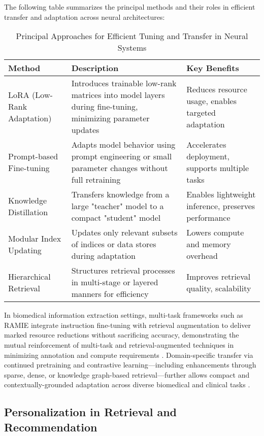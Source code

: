 \documentclass[sigconf]{acmart}
\begin{document}
The following table summarizes the principal methods and their roles in efficient transfer and adaptation across neural architectures:

\begin{table*}[htbp]
\centering
\caption{Principal Approaches for Efficient Tuning and Transfer in Neural Systems}
\label{tab:efficient_transfer}
\begin{adjustbox}{max width=\textwidth}
\begin{tabular}{lll}
\toprule
\textbf{Method} & \textbf{Description} & \textbf{Key Benefits} \\
\midrule
LoRA (Low-Rank Adaptation) & Introduces trainable low-rank matrices into model layers during fine-tuning, minimizing parameter updates & Reduces resource usage, enables targeted adaptation \\
Prompt-based Fine-tuning & Adapts model behavior using prompt engineering or small parameter changes without full retraining & Accelerates deployment, supports multiple tasks \\
Knowledge Distillation & Transfers knowledge from a large "teacher" model to a compact "student" model & Enables lightweight inference, preserves performance \\
Modular Index Updating & Updates only relevant subsets of indices or data stores during adaptation & Lowers compute and memory overhead \\
Hierarchical Retrieval & Structures retrieval processes in multi-stage or layered manners for efficiency & Improves retrieval quality, scalability \\
\bottomrule
\end{tabular}
\end{adjustbox}
\end{table*}

In biomedical information extraction settings, multi-task frameworks such as RAMIE integrate instruction fine-tuning with retrieval augmentation to deliver marked resource reductions without sacrificing accuracy, demonstrating the mutual reinforcement of multi-task and retrieval-augmented techniques in minimizing annotation and compute requirements \cite{ref32}. Domain-specific transfer via continued pretraining and contrastive learning—including enhancements through sparse, dense, or knowledge graph-based retrieval—further allows compact and contextually-grounded adaptation across diverse biomedical and clinical tasks \cite{ref33, ref55}.

\subsection{Personalization in Retrieval and Recommendation}
\end{document}
